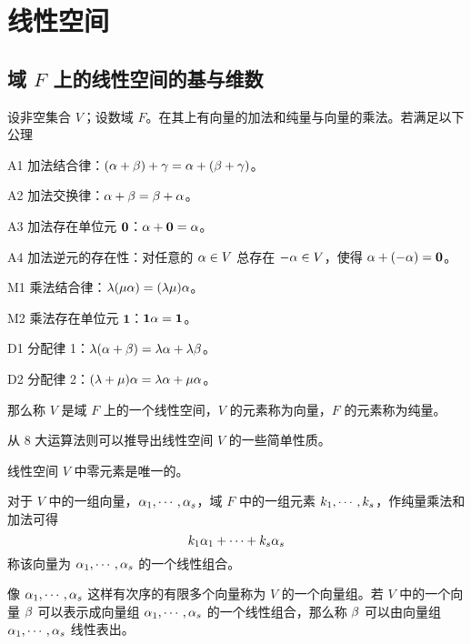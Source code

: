 \chapter{线性空间}

\section{\texorpdfstring{域 $F$ 上的线性空间的基与维数}{域 F 上的线性空间的基与维数}}

\begin{definition}[线性空间]
    设非空集合 $V$；设数域 $F$。在其上有向量的加法和纯量与向量的乘法。若满足以下公理

    A1 加法结合律：$(\alpha+\beta) + \gamma = \alpha +(\beta+\gamma)$。
    
    A2 加法交换律：$\alpha + \beta = \beta + \alpha$。
    
    A3 加法存在单位元 $\boldsymbol{0}$：$\alpha + \boldsymbol{0} = \alpha$。
    
    A4 加法逆元的存在性：对任意的 $\alpha \in V$ 总存在 $-\alpha\in V$，使得 $\alpha + (-\alpha) = \boldsymbol{0}$。
    
    M1 乘法结合律：$\lambda(\mu \alpha) = (\lambda \mu) \alpha$。
    
    M2 乘法存在单位元 $\boldsymbol{1}$：$\boldsymbol{1} \alpha = \boldsymbol{1}$。
    
    D1 分配律 1：$\lambda(\alpha+\beta) = \lambda \alpha + \lambda \beta$。
    
    D2 分配律 2：$(\lambda + \mu)\alpha = \lambda \alpha + \mu \alpha$。

    那么称 $V$ 是域 $F$ 上的一个线性空间，$V$ 的元素称为向量，$F$ 的元素称为纯量。
\end{definition}

从 $8$ 大运算法则可以推导出线性空间 $V$ 的一些简单性质。

\begin{theorem}
    线性空间 $V$ 中零元素是唯一的。
\end{theorem}

对于 $V$ 中的一组向量，$\alpha_1,\cdots,\alpha_s$，域 $F$ 中的一组元素 $k_1,\cdots,k_s$，作纯量乘法和加法可得
\[ k_1\alpha_1+\cdots+k_s\alpha_s \]
称该向量为 $\alpha_1,\cdots,\alpha_s$ 的一个线性组合。

像 $\alpha_1,\cdots,\alpha_s$ 这样有次序的有限多个向量称为 $V$ 的一个向量组。若 $V$ 中的一个向量 $\beta$ 可以表示成向量组 $\alpha_1,\cdots,\alpha_s$ 的一个线性组合，那么称 $\beta$ 可以由向量组 $\alpha_1,\cdots,\alpha_s$ 线性表出。


